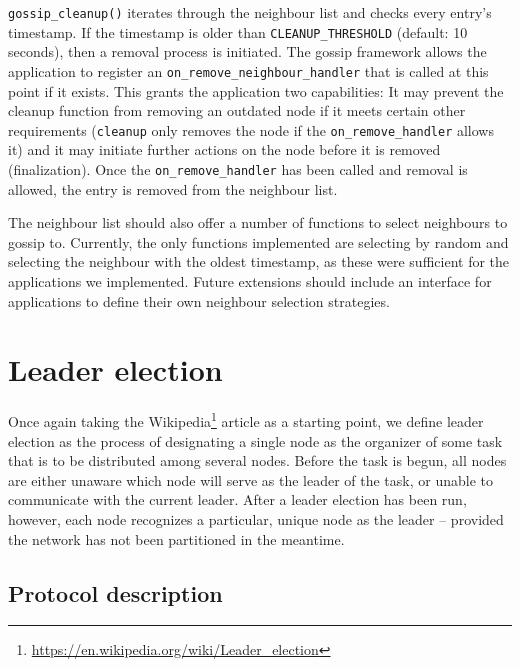 \documentclass[11pt,
  a4paper,
  ngerman,
  BCOR=7mm
]{scrartcl}
\begin{document}
\lstinline!gossip_cleanup()! iterates through the neighbour list and
checks every entry's timestamp. If the timestamp is older than
\lstinline!CLEANUP_THRESHOLD! (default: 10 seconds), then a removal
process is initiated. The gossip framework allows the application to
register an \lstinline!on_remove_neighbour_handler! that is called at
this point if it exists. This grants the application two capabilities:
It may prevent the cleanup function from removing an outdated node if it
meets certain other requirements (\lstinline!cleanup! only removes the
node if the \lstinline!on_remove_handler! allows it) and it may initiate
further actions on the node before it is removed (finalization). Once
the \lstinline!on_remove_handler! has been called and removal is
allowed, the entry is removed from the neighbour list.

The neighbour list should also offer a number of functions to select
neighbours to gossip to. Currently, the only functions implemented are
selecting by random and selecting the neighbour with the oldest
timestamp, as these were sufficient for the applications we implemented.
Future extensions should include an interface for applications to define
their own neighbour selection strategies.

\section*{Leader election}
\label{sec:Leader_election}
Once again taking the
Wikipedia\footnote{\url{https://en.wikipedia.org/wiki/Leader_election}}
article as a starting point, we define leader election as the process of
designating a single node as the organizer of some task that is to be
distributed among several nodes.  Before the task is begun, all nodes
are either unaware which node will serve as the leader of the task, or
unable to communicate with the current leader. After a leader election
has been run, however, each node recognizes a particular, unique node as
the leader -- provided the network has not been partitioned in the
meantime.

\subsection*{Protocol description}
\label{sub:protocol_leader_election}
\end{document}
